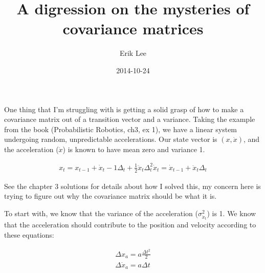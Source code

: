 \documentclass{article}
\author{Erik Lee}
\date{2014-10-24}
\title{A digression on the mysteries of covariance matrices}
\begin{document}
One thing that I'm struggling with is getting a solid grasp of how to make a
covariance matrix out of a transition vector and a variance. Taking the example
from the book (Probabilistic Robotics, ch3, ex 1), we have a linear system
undergoing random, unpredictable accelerations. Our state vector is
$\left(x,\dot{x}\right)$, and the acceleration ($\ddot{x}$) is known to have
mean zero and variance 1.

\begin{gather}
x_t = x_{t-1} + \dot{x}_t-1\Delta_t + \frac{1}{2}\ddot{x}_t\Delta_t^2
\dot{x}_t = \dot{x}_{t-1} + \ddot{x}_t\Delta_t 
\end{gather}

See the chapter 3 solutions for details about how I solved this, my concern
here is trying to figure out why the covariance matrix should be what it is.

To start with, we know that the variance of the acceleration
($\sigma_{\ddot{x}_t}^2$) is 1. We know that the acceleration should contribute
to the position and velocity according to these equations:

\begin{gather}
  \Delta x_a = a \frac{\Delta t^2}{2} \\
  \Delta \dot{x}_a = a \Delta t 
\end{gather}
\end{document}
